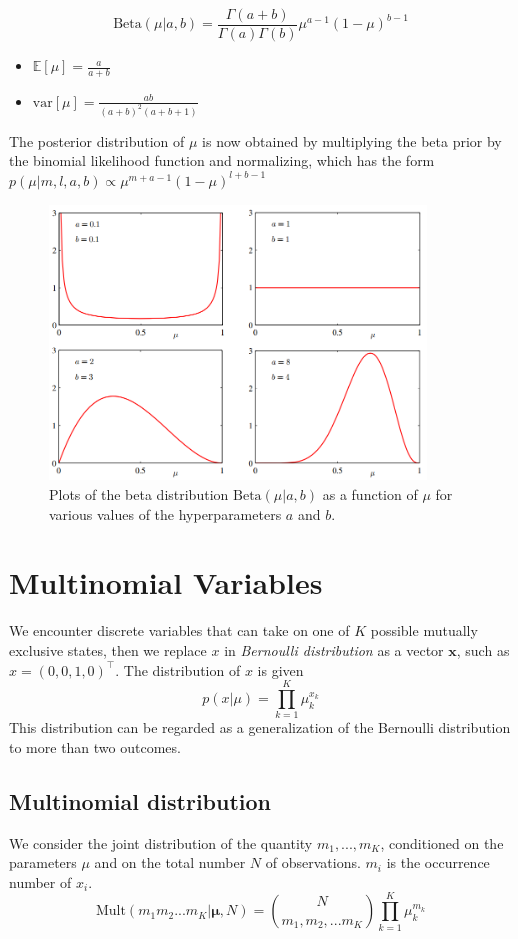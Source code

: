 \documentclass[a4paper, 12pt]{book} %
\begin{document}
\begin{equation}
\mathrm{Beta}(\mu|a,b)=\frac{\Gamma{(a+b)}}{\Gamma{(a)}\Gamma{(b)}}\mu^{a-1}(1-\mu)^{b-1}
\end{equation}
\begin{itemize}
	\item $\mathbb{E}[\mu]=\frac{a}{a+b}$
\item $\mathrm{var}[\mu]=\frac{ab}{(a+b)^2(a+b+1)}$
\end{itemize}
The posterior distribution of $\mu$ is now obtained by multiplying the beta prior by the binomial likelihood function and normalizing, which has the form $p(\mu|m,l,a,b) \propto \mu^{m+a-1}(1-\mu)^{l+b-1}$
\begin{figure}[htpb]
	\centering
	\includegraphics[width=10cm]{figures/beta_distribution.png}
	\caption{Plots of the beta distribution $\mathrm{Beta}{(\mu|a, b)}$ as a function of $\mu$ for various values of the
hyperparameters $a$ and $b$.}
	\label{fig:boat1}
\end{figure}


\section{Multinomial Variables}
We encounter discrete variables that can take on one of $K$
possible mutually exclusive states, then we replace $x$ in \emph{Bernoulli distribution} as a vector $\boldsymbol{x}$, such as $x=(0,0,1,0)^\top$. The distribution of $x$ is given 
\begin{equation}
p(x|\mu)=\prod_{k=1}^{K}\mu_k^{x_k}
\end{equation} 
This distribution can be regarded as a generalization of the Bernoulli distribution to more than two outcomes.

\subsection{Multinomial distribution}
We consider the joint distribution of the quantity $m_1,...,m_K$, conditioned on the parameters $\mu$ and on the total number $N$ of observations. $m_i$ is the occurrence number of $x_i$.
\begin{equation}
\mathrm{Mult}{(m_1m_2...m_K|\boldsymbol{\mu},N)}=\binom{N}{m_1,m_2,...m_K}\prod_{k=1}^K{\mu_{k}^{m_k}}
\end{equation}
\end{document}

